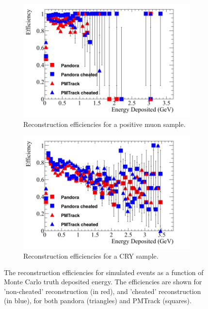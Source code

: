 \begin{figure}[h!]
  \centering
  \begin{subfigure}{0.48\textwidth}
    \centering
    \includegraphics[width=\textwidth]{Effic_AntiMuon_500V_All_EnDepos}
    \caption{Reconstruction efficiencies for a positive muon sample.}
    \label{fig:SimEffic_EnDepos_AMu}
  \end{subfigure}%
  \hspace{0.03\textwidth}%
  \begin{subfigure}{0.48\textwidth}
    \centering
    \includegraphics[width=\textwidth]{Effic_Cosmics_500V_All_EnDepos}
    \caption{Reconstruction efficiencies for a CRY sample.}
    \label{fig:SimEffic_EnDepos_CRY}
  \end{subfigure}
  \caption[The reconstruction efficiencies for simulated events as a function of Monte Carlo truth deposited energy.]
          {The reconstruction efficiencies for simulated events as a function of Monte Carlo truth deposited energy. The efficiencies are shown for 'non-cheated' reconstruction (in red), and 'cheated' reconstruction (in blue), for both pandora (triangles) and PMTrack (squares).}
          \label{fig:SimEffic_EnDepos}
\end{figure}

